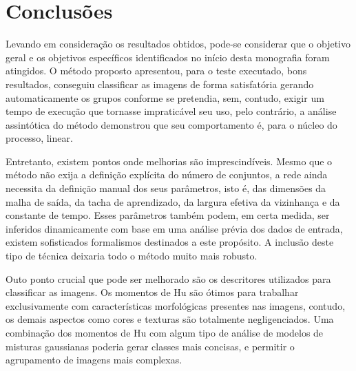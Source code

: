 \chapter{Conclusões}

Levando em consideração os resultados obtidos, pode-se considerar que o
objetivo geral e os objetivos específicos identificados no início desta
monografia foram atingidos. O método proposto apresentou, para o teste
executado, bons resultados, conseguiu classificar as imagens de forma
satisfatória gerando automaticamente os grupos conforme se pretendia, sem,
contudo, exigir um tempo de execução que tornasse impraticável seu uso,
pelo contrário, a análise assintótica do método demonstrou que seu
comportamento é, para o núcleo do processo, linear.

Entretanto, existem pontos onde melhorias são imprescindíveis. Mesmo que o
método não exija a definição explícita do número de conjuntos, a rede ainda
necessita da definição manual dos seus parâmetros, isto é, das dimensões da
malha de saída, da tacha de aprendizado, da largura efetiva da vizinhança
e da constante de tempo. Esses parâmetros também
podem, em certa medida, ser inferidos dinamicamente com base em uma análise
prévia dos dados de entrada, existem sofisticados formalismos destinados a
este propósito. A inclusão deste tipo de técnica deixaria todo o método muito
mais robusto.

Outo ponto crucial que pode ser melhorado são os descritores utilizados para
classificar as imagens. Os momentos de Hu são ótimos para trabalhar
exclusivamente com características morfológicas presentes nas imagens, contudo,
os demais aspectos como cores e texturas são totalmente negligenciados. Uma
combinação dos momentos de Hu com algum tipo de análise de modelos de misturas
gaussianas poderia gerar classes
mais concisas, e permitir o agrupamento de imagens mais complexas.
